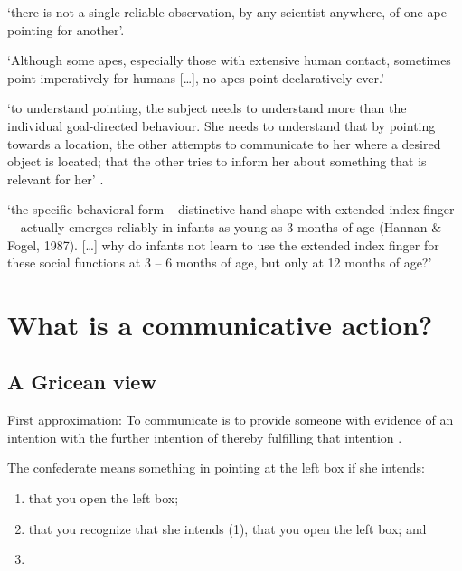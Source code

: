 \documentclass[12pt]{extarticle}
\begin{document}
\begin{multicols}{3}
‘there is not a single reliable observation, by any scientist anywhere, of one ape pointing for another’.
\citep[p.\ 507]{Tomasello:2010dy}
 
‘Although some apes, especially those with extensive human contact, sometimes point imperatively for humans […],
no apes point declaratively ever.’
\citep[p.\ 510]{Tomasello:2010dy}
 
‘to understand pointing, the subject needs to understand more than the individual goal-directed behaviour. She needs to understand that by pointing towards a location, the other attempts to communicate to her where a desired object is located; that the other tries to inform her about something that is relevant for her’
\citep[p.\ 6]{Moll:2007gu}.
 
‘the specific behavioral form — distinctive hand shape with extended index finger — actually emerges reliably in infants as young as 3 months of age (Hannan \& Fogel, 1987). […] why do infants not learn to use the extended index finger for these social functions at 3 – 6 months of age, but only at 12 months of age?’ \citep[p.\ 716]{Tomasello:2007fi}
 
 
 
\section{What is a communicative action?}
 
\subsection{A Gricean view}
 
First approximation: To communicate is to provide someone with evidence of an intention with the further intention of thereby fulfilling that intention
\citep[compare][chapter 14]{Grice:1989ha}.
 
The confederate means something in pointing at the left box if she intends:
 
\begin{enumerate}
 
\item
 
that you open the left box;
 
\item
 
that you recognize that she intends (1), that you open the left box; and 
 
\item
 

\end{enumerate}
\end{multicols}
\end{document}
